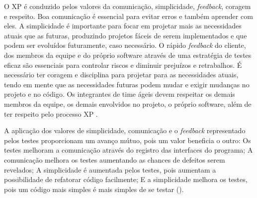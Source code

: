         O XP é conduzido pelos valores da comunicação, simplicidade, \emph{feedback}, coragem e respeito. Boa comunicação é essencial para evitar erros e também aprender com eles. A simplicidade é importante para focar em projetar mais as necessidades atuais que as futuras, produzindo projetos fáceis de serem implementados e que podem ser evoluídos futuramente, caso necessário. O rápido \emph{feedback} do cliente, dos membros da equipe e do próprio software através de uma estratégia de testes eficaz são essenciais para controlar riscos e diminuir prejuízos e retrabalhos. É necessário ter coragem e disciplina para projetar para as necessidades atuais, tendo em mente que as necessidades futuras podem mudar e exigir mudanças no projeto e no código. Os integrantes de time ágeis devem respeitar os demais membros da equipe, os demais envolvidos no projeto, o próprio software, além de ter respeito pelo processo XP \cite{Pressman2015}.
        
        A aplicação dos valores de simplicidade, comunicação e o \emph{feedback} representado pelos testes proporcionam um avanço mútuo, pois um valor beneficia o outro:  Os testes melhoram a comunicação através do registro das interfaces do programa; A comunicação melhora os testes aumentando as chances de defeitos serem revelados; A simplicidade é aumentada pelos testes, pois aumentam a possibilidade de refatorar código facilmente; E a simplicidade melhora os testes, pois um código mais simples é mais simples de se testar (\cite{beck1998}).
        
